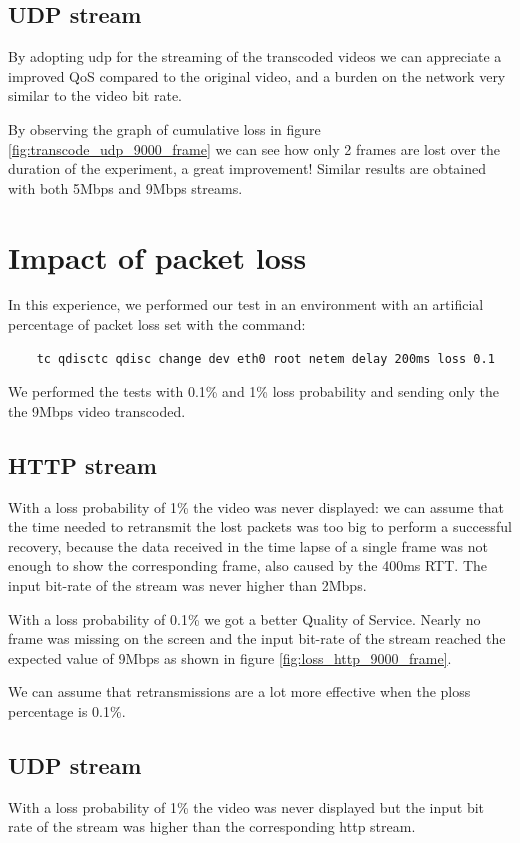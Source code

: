 \documentclass{exam}
\begin{document}
\subsection{UDP stream}
By adopting udp for the streaming of the transcoded videos we can appreciate a improved QoS compared to the original video, and a burden on the network very similar to the video bit rate.

By observing the graph of cumulative loss in figure \ref{fig:transcode_udp_9000_frame} we can see how only 2 frames are lost over the duration of the experiment, a great improvement!
Similar results are obtained with both 5Mbps and 9Mbps streams.



\section{Impact of packet loss}
In this experience, we performed our test in an environment with an artificial percentage of packet loss set with the command:
\begin{lstlisting}
    tc qdisctc qdisc change dev eth0 root netem delay 200ms loss 0.1
\end{lstlisting}
We performed the tests with 0.1\% and 1\% loss probability and sending only the the 9Mbps video transcoded.

\subsection{HTTP stream}
With a loss probability of 1\% the video was never displayed: we can assume that the time needed to retransmit the lost packets was too big to perform a successful recovery, because the data received in the time lapse of a single frame was not enough to show the corresponding frame, also caused by the 400ms RTT. The input bit-rate of the stream was never higher than 2Mbps.

With a loss probability of 0.1\% we got a better Quality of Service. Nearly no frame was missing on the screen and the input bit-rate of the stream reached the expected value of 9Mbps as shown in figure \ref{fig:loss_http_9000_frame}.


We can assume that retransmissions are a lot more effective when the ploss percentage is 0.1\%.

\subsection{UDP stream}
With a loss probability of 1\% the video was never displayed but the input bit rate of the stream was higher than the corresponding http stream. 
\end{document}
